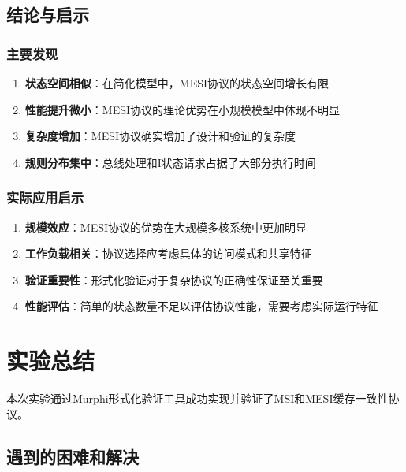 \documentclass[a4paper]{article}
\begin{document}
\subsection{结论与启示}

\subsubsection{主要发现}

\begin{enumerate}
    \item \textbf{状态空间相似}：在简化模型中，MESI协议的状态空间增长有限
    
    \item \textbf{性能提升微小}：MESI协议的理论优势在小规模模型中体现不明显
    
    \item \textbf{复杂度增加}：MESI协议确实增加了设计和验证的复杂度
    
    \item \textbf{规则分布集中}：总线处理和I状态请求占据了大部分执行时间
\end{enumerate}

\subsubsection{实际应用启示}

\begin{enumerate}
    \item \textbf{规模效应}：MESI协议的优势在大规模多核系统中更加明显
    
    \item \textbf{工作负载相关}：协议选择应考虑具体的访问模式和共享特征
    
    \item \textbf{验证重要性}：形式化验证对于复杂协议的正确性保证至关重要
    
    \item \textbf{性能评估}：简单的状态数量不足以评估协议性能，需要考虑实际运行特征
\end{enumerate}


\section{实验总结}

本次实验通过Murphi形式化验证工具成功实现并验证了MSI和MESI缓存一致性协议。

\subsection{遇到的困难和解决}
\end{document}
